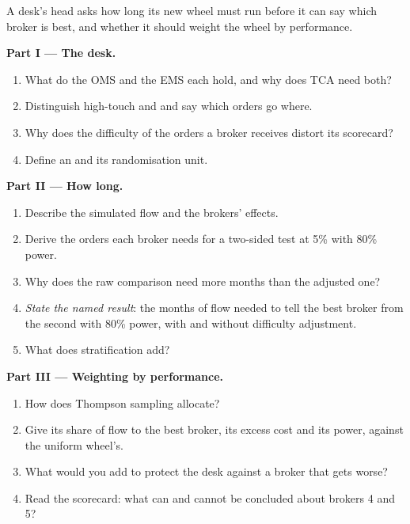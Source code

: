 \begin{problem}\label{pb:mx:the-buy-side-trading-desk-and-its-brokers:1}
A desk's head asks how long its new wheel must run before it can say which broker is best, and whether it should weight the wheel by performance.

\medskip\noindent\textbf{Part I --- The desk.}
\begin{enumerate}
\item What do the OMS and the EMS each hold, and why does TCA need both?
\item Distinguish high-touch and  and say which orders go where.
\item Why does the difficulty of the orders a broker receives distort its scorecard?
\item Define an  and its randomisation unit.
\end{enumerate}

\medskip\noindent\textbf{Part II --- How long.}
\begin{enumerate}[resume]
\item Describe the simulated flow and the brokers' effects.
\item Derive the orders each broker needs for a two-sided test at 5\% with 80\% power.
\item Why does the raw comparison need more months than the adjusted one?
\item \emph{State the named result}: the months of flow needed to tell the best broker from the second with 80\% power, with and without difficulty
adjustment.
\item What does stratification add?
\end{enumerate}

\medskip\noindent\textbf{Part III --- Weighting by performance.}
\begin{enumerate}[resume]
\item How does Thompson sampling allocate?
\item Give its share of flow to the best broker, its excess cost and its power, against the uniform wheel's.
\item What would you add to protect the desk against a broker that gets worse?
\item Read the scorecard: what can and cannot be concluded about brokers 4 and 5?
\end{enumerate}


\end{problem}
